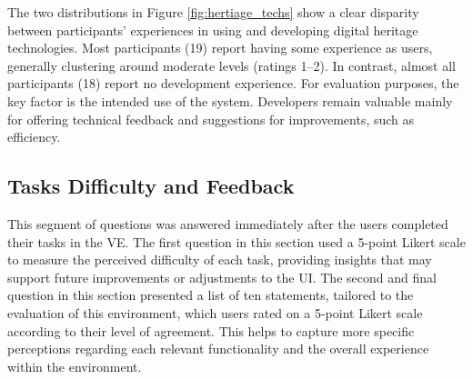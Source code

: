 The two distributions in Figure \ref{fig:hertiage_techs} show a clear disparity between participants' experiences in using and developing digital heritage technologies. Most participants (19) report having some experience as users, generally clustering around moderate levels (ratings 1–2). 
In contrast, almost all participants (18) report no development experience.
For evaluation purposes, the key factor is the intended use of the system. Developers remain valuable mainly for offering technical feedback and suggestions for improvements, such as efficiency.







\subsection{Tasks Difficulty and Feedback}

This segment of questions was answered immediately after the users completed their tasks in the \gls{VE}.
The first question in this section used a 5-point Likert scale to measure the perceived difficulty of each task, providing insights that may support future improvements or adjustments to the \gls{UI}.
The second and final question in this section presented a list of ten statements, tailored to the evaluation of this environment, which users rated on a 5-point Likert scale according to their level of agreement.
This helps to capture more specific perceptions regarding each relevant functionality and the overall experience within the environment.

